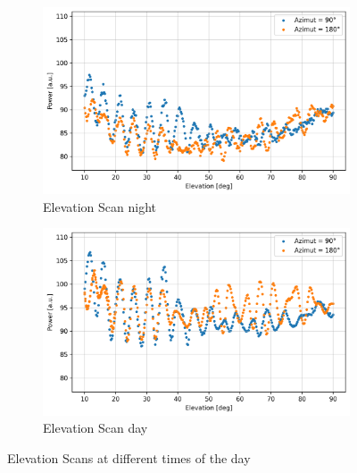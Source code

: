 \begin{figure}[H]
\centering
\begin{subfigure}[t]{0.45\textwidth}
    \centering
    \includegraphics[width=\linewidth]{assets/elev_scan_night.png}
    \caption{Elevation Scan night}
\end{subfigure}
\begin{subfigure}[t]{0.45\textwidth}
    \centering
    \includegraphics[width=\linewidth]{assets/elev_scan_day.png}
    \caption{Elevation Scan day}
\end{subfigure}
\caption{Elevation Scans at different times of the day}
\label{fig:elev_scan}
\end{figure}
